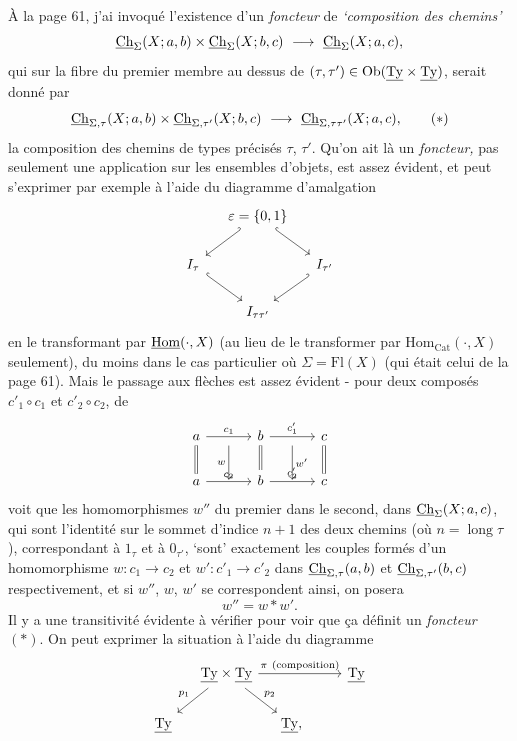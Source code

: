 À la page 61, j'ai invoqué l'existence d'un \textit{foncteur} de \textit{`composition des chemins'}
\[
\Ch_{\Sigma}(X;a,b)\times\Ch_{\Sigma}(X;b,c) \ \longrightarrow\ \Ch_{\Sigma}(X;a,c),
\]
qui sur la fibre du premier membre au dessus de $(\tau,\tau') \in \operatorname{Ob}(\underline{\mathrm{Ty}}\times\underline{\mathrm{Ty}})$, serait donné par
\[
\Ch_{\Sigma,\tau}(X;a,b)\times\Ch_{\Sigma,\tau'}(X;b,c) \ \longrightarrow\ \Ch_{\Sigma,\tau\tau'}(X;a,c), \tag*{$(*)$}
\]
la composition des chemins de types précisés $\tau$, $\tau'$. Qu'on ait là un \textit{foncteur,} pas seulement une application sur les ensembles d'objets, est assez évident, et peut s'exprimer par exemple à l'aide du diagramme d'amalgation
\[
\begin{tikzcd}[column sep=small]
 & \varepsilon = \{0,1\} \ar[dl,hook'] \ar[dr,hook] & \\
I_{\tau} \ar[dr,hook] & & I_{\tau'} \ar[dl,hook'] \\
 & I_{\tau\tau'} &
\end{tikzcd}
\]
en le transformant par $\underline{\mathrm{Hom}}(\cdot,X)$ (au lieu de le transformer par $\mathrm{Hom}_{\mathrm{Cat}}(\cdot,X)$ seulement), du moins dans le cas particulier où $\Sigma = \mathrm{Fl}(X)$ (qui était celui de la page 61). Mais le passage aux flèches est assez évident - pour deux composés $c'_1\circ c_1$ et $c'_2\circ c_2$, de
\[
\begin{tikzcd}[column sep=small]
a \ar[rr,"c_1"] \ar[d,equal] & {} \ar[d,"w"'] & b \ar[rr,"c'_1"] \ar[d,equal] & {} \ar[d,"w'"] & c \ar[d,equal] \\
a \ar[rr,"c_2"] & {} & b \ar[rr,"c'_2"] & {} & c
\end{tikzcd}
\]
 voit que les homomorphismes $w''$ du premier dans le second, dans $\underline{\mathrm{Ch}}_{\Sigma}(X;a,c)$, qui sont l'identité sur le sommet d'indice $n+1$ des deux chemins (où $n = \operatorname{long}\tau$), correspondant à $1_{\tau}$ et à $0_{\tau'}$, `sont' exactement les couples
formés d'un homomorphisme $w : c_1 \longrightarrow c_2$ et $w' : c'_1 \longrightarrow c'_2$ dans $\underline{\mathrm{Ch}}_{\Sigma,\tau}(a,b)$ et $\underline{\mathrm{Ch}}_{\Sigma,\tau'}(b,c)$ respectivement, et si $w''$, $w$, $w'$ se correspondent ainsi, on posera
\[
w'' = w * w'.
\]
Il y a une transitivité évidente à vérifier pour voir que ça définit un \textit{foncteur} $(*)$. On peut exprimer la situation à l'aide du diagramme
\[
\begin{tikzcd}[column sep=small]
 & \Ty\times\Ty \ar[rrr,"\pi\ (\text{composition})"] \ar[dl,"p_1"'] \ar[dr,"p_2"] & & & \Ty \\
\Ty & & \Ty, & &
\end{tikzcd}
\]
